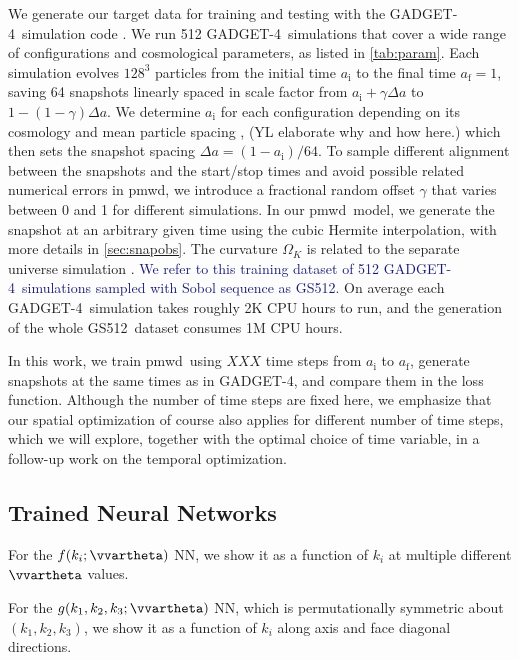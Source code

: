 \documentclass[modern, trackchanges, dvipsnames]{aastex631}
\newcommand{\pmwd}{{\usefont{T1}{nova}{m}{sl}pmwd}}
\newcommand{\GADGET}{{{\fontsize{10pt}{12pt}\selectfont GADGET}-4}}
\newcommand{\GSDATA}{{GS512}}
\newcommand{\OmegaK}{\Omega_K}
\newcommand{\ic}{\mathrm{i}}
\newcommand{\f}{\mathrm{f}}
\newcommand{\YL}[1]{\textcolor{Bittersweet}{#1}}
\newcommand{\YZ}[1]{\textcolor{MidnightBlue}{#1}}
\begin{document}
We generate our target data for training and testing with the \GADGET\
simulation code \citep{GADGET-4}.
We run 512 \GADGET\ simulations that cover a wide range of
configurations and cosmological parameters, as listed in
\autoref{tab:param}.
\YL{
Each simulation evolves $128^3$ particles from the initial time $a_\ic$
to the final time $a_\f=1$, saving 64 snapshots linearly spaced in scale
factor from $a_\ic + \gamma \Delta a$ to $1 - (1 - \gamma) \Delta a$.
We determine $a_\ic$ for each configuration depending on its cosmology
and mean particle spacing \citep{MichauxEtAl2021}, \YL{(YL elaborate why and how here.)} which then sets the
snapshot spacing $\Delta a = (1 - a_\ic) / 64$.
To sample different alignment between the snapshots and the start/stop
times and avoid possible related numerical errors in \pmwd, we introduce
a fractional random offset $\gamma$ that varies between 0 and 1 for
different simulations.
}
In our \pmwd\ model, we generate the snapshot at an arbitrary given time using
the cubic Hermite interpolation, with more details in \autoref{sec:snapobs}.
The curvature $\OmegaK$ is related to the separate universe simulation
\citep{LiEtAl2014, WagnerEtAl2015}.
\YZ{We refer to this training dataset of 512 \GADGET\ simulations sampled with
Sobol sequence as \GSDATA.}
On average each \GADGET\ simulation takes roughly 2K CPU hours to run, and the
generation of the whole \GSDATA\ dataset consumes 1M CPU hours.

\YL{
In this work, we train \pmwd\ using $XXX$ time steps from $a_\ic$ to
$a_\f$, generate snapshots at the same times as in \GADGET, and compare
them in the loss function.
Although the number of time steps are fixed here, we emphasize that our
spatial optimization of course also applies for different number of time
steps, which we will explore, together with the optimal choice of time
variable, in a follow-up work on the temporal optimization.
}


\subsection{Trained Neural Networks}

For the $f(k_i; \vvartheta)$ NN, we show it as a function of $k_i$ at multiple
different $\vvartheta$ values.

For the $g(k_1,k_2,k_3;\vvartheta)$ NN, which is permutationally symmetric about
$(k_1, k_2, k_3)$, we show it as a function of $k_i$ along axis and face
diagonal directions.
\end{document}
